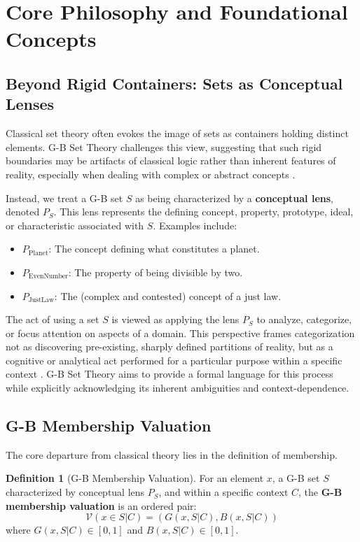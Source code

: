 \documentclass[11pt]{article}
\newcommand{\gbval}[1]{\mathcal{V}(#1)}         %
\newcommand{\gcomp}[1]{G(#1)}                   %
\newcommand{\bcomp}[1]{B(#1)}                   %
\newcommand{\pset}[1]{P_{#1}}                   %
\theoremstyle{definition}
\newtheorem{definition}{Definition}[section]
\theoremstyle{plain}
\begin{document}
\section{Core Philosophy and Foundational Concepts} \label{sec:philosophy}

\subsection{Beyond Rigid Containers: Sets as Conceptual Lenses}
Classical set theory often evokes the image of sets as containers holding distinct elements. G-B Set Theory challenges this view, suggesting that such rigid boundaries may be artifacts of classical logic rather than inherent features of reality, especially when dealing with complex or abstract concepts \cite{gb_set_theory_outline}.

Instead, we treat a G-B set $S$ as being characterized by a \textbf{conceptual lens}, denoted $\pset{S}$. This lens represents the defining concept, property, prototype, ideal, or characteristic associated with $S$. Examples include:
\begin{itemize}
    \item $\pset{\text{Planet}}$: The concept defining what constitutes a planet.
    \item $\pset{\text{EvenNumber}}$: The property of being divisible by two.
    \item $\pset{\text{JustLaw}}$: The (complex and contested) concept of a just law.
\end{itemize}
The act of using a set $S$ is viewed as applying the lens $\pset{S}$ to analyze, categorize, or focus attention on aspects of a domain. This perspective frames categorization not as discovering pre-existing, sharply defined partitions of reality, but as a cognitive or analytical act performed for a particular purpose within a specific context \cite{gb_set_theory_outline}. G-B Set Theory aims to provide a formal language for this process while explicitly acknowledging its inherent ambiguities and context-dependence.

\subsection{G-B Membership Valuation}
The core departure from classical theory lies in the definition of membership.

\begin{definition}[G-B Membership Valuation] \label{def:gb_membership}
For an element $x$, a G-B set $S$ characterized by conceptual lens $\pset{S}$, and within a specific context $C$, the \textbf{G-B membership valuation} is an ordered pair:
$$ \gbval{x \in S | C} = (\gcomp{x, S|C}, \bcomp{x, S|C}) $$
where $\gcomp{x, S|C} \in [0, 1]$ and $\bcomp{x, S|C} \in [0, 1]$.
\end{definition}
\end{document}
